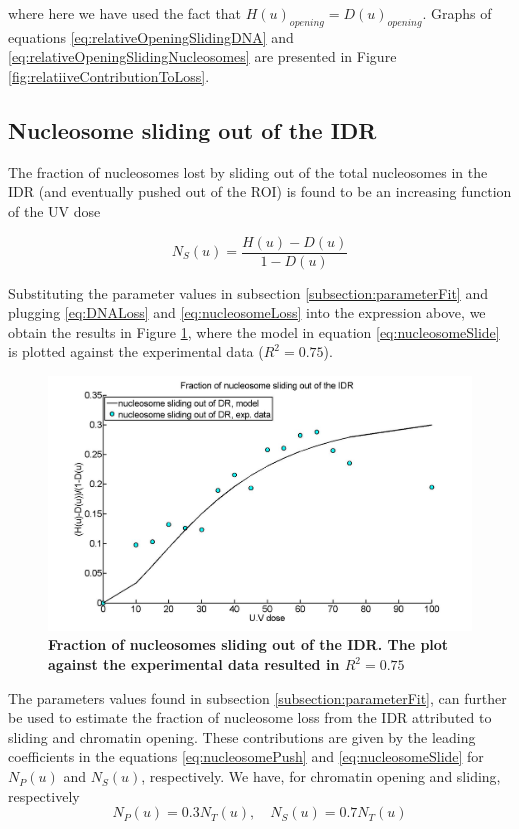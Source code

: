 \documentclass[12pt]{article}
\begin{document}
where here we have used the fact that $H(u)_{opening} = D(u)_{opening}$. Graphs of
equations \eqref{eq:relativeOpeningSlidingDNA} and \eqref{eq:relativeOpeningSlidingNucleosomes}  are presented in Figure \ref{fig:relatiiveContributionToLoss}.

\subsection{Nucleosome sliding out of the IDR}
The fraction of nucleosomes lost by sliding out of the total nucleosomes in the IDR
(and eventually pushed out of the ROI) is found to be an increasing function
of the UV dose

\begin{equation*}
N_S(u) = \frac{H(u)-D(u)}{1-D(u)}
\end{equation*}

Substituting the parameter values in subsection \ref{subsection:parameterFit} and plugging \eqref{eq:DNALoss} and \eqref{eq:nucleosomeLoss} into the expression above, we obtain the results in Figure \ref{fig:fractionSlidingOutOfIDR}, where the model
in equation \eqref{eq:nucleosomeSlide} is plotted against the experimental data ($R^2 = 0.75$).

\begin{figure}
\centering
\includegraphics[width=0.5\linewidth, height=0.3\textheight]{fractionSlidingOutOfIDR}
\caption{\textbf{Fraction of nucleosomes sliding out of the IDR. The plot
		against the experimental data resulted in $R^2 = 0.75$}}
\label{fig:fractionSlidingOutOfIDR}
\end{figure}

The parameters values found in subsection \ref{subsection:parameterFit}, can further be used to estimate the fraction of nucleosome loss from the IDR attributed to sliding and
chromatin opening. These contributions are given by the leading coefficients
in the equations \eqref{eq:nucleosomePush} and \eqref{eq:nucleosomeSlide} for $N_P(u)$ and $N_S(u)$, respectively. We have, for
chromatin opening and sliding, respectively
\begin{equation*}
N_P(u) = 0.3N_T(u),\quad N_S(u) = 0.7N_T(u)
\end{equation*}


\end{document}
